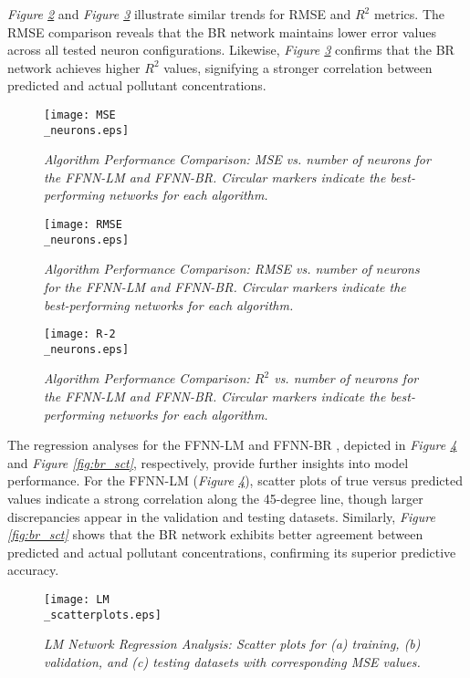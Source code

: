 \documentclass[10pt]{article}
\begin{document}
	\textit{Figure \ref{fig:comparisonRMSE}} and \textit{Figure \ref{fig:comparisonR2}} illustrate similar trends for RMSE and $R^2$ metrics. The RMSE comparison reveals that the BR network maintains lower error values across all tested neuron configurations. Likewise, \textit{Figure \ref{fig:comparisonR2}} confirms that the BR network achieves higher $R^2$ values, signifying a stronger correlation between predicted and actual pollutant concentrations.
	
	\begin{figure}[H]
		\centering
		\texttt{[image: MSE\\\_neurons.eps]}
		\caption{\textit{Algorithm Performance Comparison: MSE vs. number of neurons for the FFNN-LM and FFNN-BR. Circular markers indicate the best-performing networks for each algorithm.}}
		\label{fig:comparisonMSE}
	\end{figure}
	
	\begin{figure}[H]
		\centering
		\texttt{[image: RMSE\\\_neurons.eps]}
		\caption{\textit{Algorithm Performance Comparison: RMSE vs. number of neurons for the FFNN-LM and FFNN-BR. Circular markers indicate the best-performing networks for each algorithm.}}
		\label{fig:comparisonRMSE}
	\end{figure}
	
	\begin{figure}[H]
		\centering
		\texttt{[image: R-2\\\_neurons.eps]}
		\caption{\textit{Algorithm Performance Comparison: \(R^2\) vs. number of neurons for the FFNN-LM and FFNN-BR. Circular markers indicate the best-performing networks for each algorithm.}}
		\label{fig:comparisonR2}
	\end{figure}
	
	The regression analyses for the FFNN-LM and FFNN-BR , depicted in \textit{Figure \ref{fig:lm_sct}} and \textit{Figure \ref{fig:br_sct}}, respectively, provide further insights into model performance. For the FFNN-LM (\textit{Figure \ref{fig:lm_sct}}), scatter plots of true versus predicted values indicate a strong correlation along the 45-degree line, though larger discrepancies appear in the validation and testing datasets. Similarly, \textit{Figure \ref{fig:br_sct}} shows that the BR network exhibits better agreement between predicted and actual pollutant concentrations, confirming its superior predictive accuracy.
	
	\begin{figure}[H]
		\centering
		\texttt{[image: LM\\\_scatterplots.eps]}
		\caption{\textit{LM Network Regression Analysis: Scatter plots for (a) training, (b) validation, and (c) testing datasets with corresponding MSE values.}}
		\label{fig:lm_sct}
	\end{figure}
	
\end{document}
